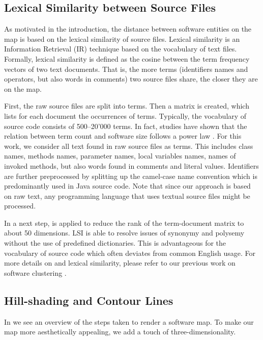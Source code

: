 \subsection{Lexical Similarity between Source Files}

As motivated in the introduction, the distance between software entities on the map is based on the lexical similarity of source files. Lexical similarity is an Information Retrieval (IR) technique based on the vocabulary of text files. Formally, lexical similarity is defined as the cosine between the term frequency vectors of two text documents. That is, the more terms (\ie identifiers names and operators, but also words in comments) two source files share, the closer they are on the map. 

First, the raw source files are split into terms. Then a matrix is created, which lists for each document the occurrences of terms. Typically, the vocabulary of source code consists of 500--20'000 terms. In fact, studies have shown that the relation between term count and software size follows a power law \cite{Zhan08a}. For this work, we consider all text found in raw source files as terms. This includes class names, methods names, parameter names, local variables names, names of invoked methods, but also words found in comments and literal values. Identifiers are further preprocessed by splitting up the camel-case name convention which is predominantly used in Java source code. Note that since our approach is based on raw text, any programming language that uses textual source files might  be processed.

In a next step, \LSI \cite{Deer90a} is applied to reduce the rank of the term-document matrix to about 50 dimensions. LSI is able to resolve issues of synonymy and polysemy without the use of predefined dictionaries. This is advantageous for the vocabulary of source code which often deviates from common English usage. For more details on \LSI and lexical similarity, please refer to our previous work on software clustering \cite{Kuhn07a}.

\subsection{Hill-shading and Contour Lines}
In  we see an overview of the steps taken to render a software map.
To make our map more aesthetically appealing, we add a touch of three-dimensionality.

